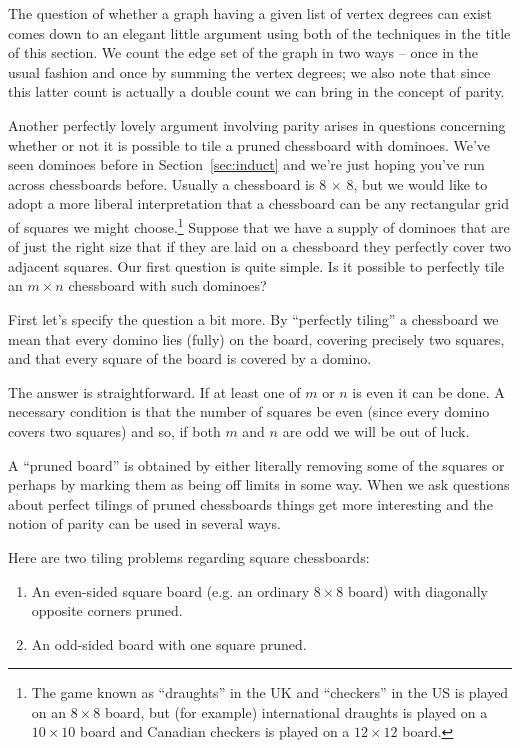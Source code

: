 The question of whether a graph having a given list of vertex degrees
can exist comes down to an elegant little argument using both of the 
techniques in the title of this section.  We count the edge set of the 
graph in two ways -- once in the usual fashion and once by summing the 
vertex degrees; we also note that since this latter count is actually
a double count we can bring in the concept of parity.

 
Another perfectly lovely argument involving parity arises in questions
concerning whether or not it is possible to tile a pruned chessboard 
with dominoes.  We've seen dominoes before in Section~\ref{sec:induct}
and we're just hoping you've run across chessboards before.  Usually
a chessboard is 8 $\times$ 8, but we would like to adopt a more
liberal interpretation that a chessboard can be any rectangular grid
of squares we might choose.\footnote{The game known as ``draughts'' in the
UK and ``checkers'' in the US is played on an $8 \times 8$ board, but 
(for example) international draughts is played on a $10 \times 10$ 
board and Canadian checkers is played on a $12 \times 12$ board.}
Suppose that we have a supply of dominoes that are of just the right
size that if they are laid on a chessboard they perfectly cover two
adjacent squares.  Our first question is quite simple.  Is it possible
to perfectly tile an $m \times n$ chessboard with such dominoes? 

First let's specify the question a bit more.  By ``perfectly tiling''
a chessboard we mean that every domino lies (fully) on the board,
covering precisely two squares, and that every square of the board 
is covered by a domino.

The answer is straightforward.  If at least one of $m$ or $n$ is even
it can be done.  A necessary condition is that the number of squares
be even (since every domino covers two squares) and so, if both $m$ 
and $n$ are odd we will be out of luck.

A ``pruned board'' is obtained by either literally removing some of the
squares or perhaps by marking them as being off limits in some way.  
When we ask questions about perfect tilings of pruned chessboards things
get more interesting and the notion of parity can be used in several
ways.

Here are two tiling problems regarding square chessboards:


\begin{enumerate}
\item An even-sided square board (e.g. an ordinary $8 \times 8$ board) 
with diagonally opposite corners pruned.  
\item An odd-sided board with one square pruned.
\end{enumerate} 

